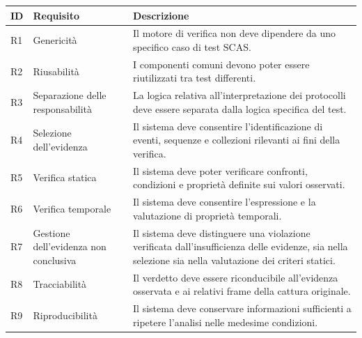 \begin{center}
\begin{minipage}{\textwidth}
\centering

\begingroup
\small
\setlength{\tabcolsep}{4pt}
\renewcommand{\arraystretch}{1.15}

\begin{tabularx}{\textwidth}{|
    >{\centering\arraybackslash}p{}|
    >{\raggedright\arraybackslash}p{}|
    >{\raggedright\arraybackslash}X|}
\hline
\rowcolor{blue!7}
\textbf{ID} &
\textbf{Requisito} &
\textbf{Descrizione} \\
\hline

R1 & Genericità &
Il motore di verifica non deve dipendere da uno specifico caso di test SCAS. \\
\hline

R2 & Riusabilità &
I componenti comuni devono poter essere riutilizzati tra test differenti. \\
\hline

R3 & Separazione delle responsabilità &
La logica relativa all'interpretazione dei protocolli deve essere separata dalla logica specifica del test. \\
\hline

R4 & Selezione dell'evidenza &
Il sistema deve consentire l'identificazione di eventi, sequenze e collezioni rilevanti ai fini della verifica. \\
\hline

R5 & Verifica statica &
Il sistema deve poter verificare confronti, condizioni e proprietà definite sui valori osservati. \\
\hline

R6 & Verifica temporale &
Il sistema deve consentire l'espressione e la valutazione di proprietà temporali. \\
\hline

R7 & Gestione dell'evidenza non conclusiva &
Il sistema deve distinguere una violazione verificata dall'insufficienza delle evidenze, sia nella selezione sia nella valutazione dei criteri statici. \\
\hline

R8 & Tracciabilità &
Il verdetto deve essere riconducibile all'evidenza osservata e ai relativi frame della cattura originale. \\
\hline

R9 & Riproducibilità &
Il sistema deve conservare informazioni sufficienti a ripetere l'analisi nelle medesime condizioni. \\
\hline


\end{tabularx}
\end{minipage}
\end{center}
